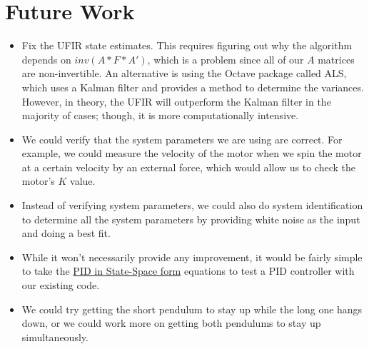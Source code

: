 \documentclass{article}
\begin{document}
\section{Future Work}
\begin{itemize}
\item Fix the UFIR state estimates. This requires figuring out why the algorithm depends on $inv(A*F*A')$, which is a problem since all of our $A$ matrices are non-invertible. An alternative is using the Octave package called ALS, which uses a Kalman filter and provides a method to determine the variances. However, in theory, the UFIR will outperform the Kalman filter in the majority of cases; though, it is more computationally intensive.
\item We could verify that the system parameters we are using are correct. For example, we could measure the velocity of the motor when we spin the motor at a certain velocity by an external force, which would allow us to check the motor's $K$ value.
\item Instead of verifying system parameters, we could also do system identification to determine all the system parameters by providing white noise as the input and doing a best fit.
\item While it won't necessarily provide any improvement, it would be fairly simple to take the \href{https://github.com/floft/PIDinStateSpace}{PID in State-Space form} equations to test a PID controller with our existing code.
\item We could try getting the short pendulum to stay up while the long one hangs down, or we could work more on getting both pendulums to stay up simultaneously.
\end{itemize}
\end{document}
